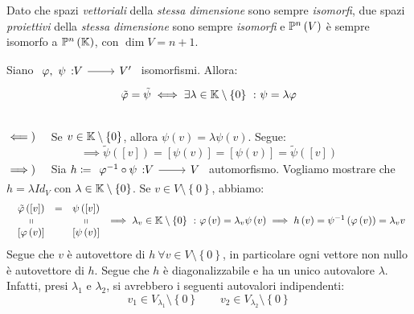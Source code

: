 Dato che spazi \textit{vettoriali} della \textit{stessa dimensione} sono sempre \textit{isomorfi}, due spazi \textit{proiettivi} della \textit{stessa dimensione} sono sempre \textit{isomorfi} e $\proj{V}$ è sempre isomorfo a $\proj[n]{\kamp}$, con $\dim V=n+1$.
\begin{lemming}
	Siano $\funz{\phi,\ \psi}{V}{V'}$ isomorfismi. Allora:
	\begin{equation}
		\tilde{\phi}=\tilde{\psi}\iff\exists\lambda\in\kamp\setminus\left\{0\right\}\ \colon\psi=\lambda\phi
	\end{equation}
\vspace{-6mm}
\end{lemming}
\begin{demonstration}~{}\\
$\impliedby)\quad$ Se $v\in\mathbb{K}\setminus\left\{0\right\}$, allora $\psi\left(v\right)=\lambda\psi\left(v\right)$. Segue:
\begin{equation*}
	\implies \tilde{\psi}\left(\left[v\right]\right)=\left[\psi\left(v\right)\right]=\left[\psi\left(v\right)\right]=\tilde{\psi}\left(\left[v\right]\right)
\end{equation*}
$\implies)\quad$ Sia $h\coloneqq \funz{\phi^{-1}\circ \psi}{V}{V}$ automorfismo. Vogliamo mostrare che $h=\lambda Id_V$ con $\lambda\in\mathbb{K}\setminus\left\{0\right\}$. Se $v\in V\setminus\left\{0\right\}$, abbiamo:
\begin{equation*}
	\begin{array}{c}
\begin{array}{ccc}
	\tilde{\varphi}\left(\left[v\right]\right)&=&\psi\left(\left[v\right]\right)\\
	\shortparallel&&\shortparallel\\
	\left[\varphi\left(v\right)\right]&&\left[\psi\left(v\right)\right]
\end{array}
\implies \lambda_v\in\mathbb{K}\setminus\left\{0\right\}\ \colon \varphi\left(v\right)=\lambda_v\psi\left(v\right)
\implies h\left(v\right)=\psi^{-1}\left(\varphi\left(v\right)\right)=\lambda_v v
\end{array}
\end{equation*}
Segue che $v$ è autovettore di $h\ \forall v\in V\setminus\left\{0\right\}$, in particolare ogni vettore non nullo è autovettore di $h$. Segue che $h$ è diagonalizzabile e ha un unico autovalore $\lambda$. Infatti, presi $\lambda_1$ e $\lambda_2$, si avrebbero i seguenti autovalori indipendenti:
\begin{equation*}
	v_1\in V_{\lambda_1}\setminus\left\{0\right\}\qquad v_2\in V_{\lambda_2}\setminus\left\{0\right\}

\end{equation*}
\end{demonstration}
